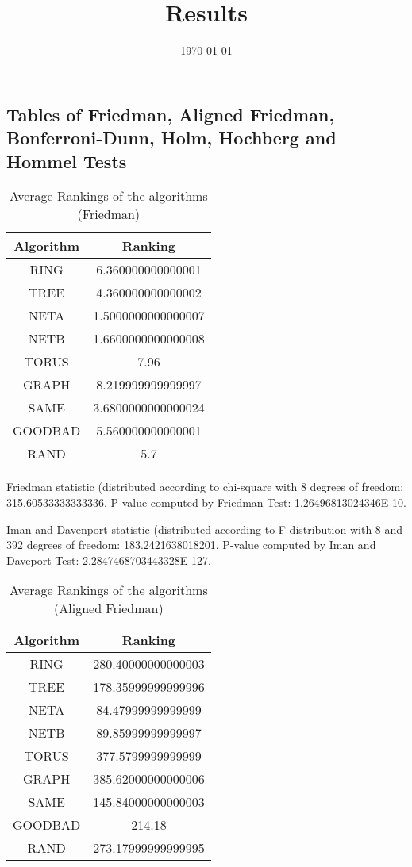 \documentclass[a4paper,10pt]{article}
\title{Results}
\author{}
\date{\today}
\begin{document}
\begin{landscape}
\oddsidemargin 0in \topmargin 0in\maketitle
\section{Tables of Friedman, Aligned Friedman, Bonferroni-Dunn, Holm, Hochberg and Hommel Tests}
\begin{table}[!htp]
\centering
\caption{Average Rankings of the algorithms (Friedman)
}\begin{tabular}{c|c}
Algorithm&Ranking\\
\hline
 RING&6.360000000000001\\
 TREE&4.360000000000002\\
 NETA&1.5000000000000007\\
 NETB&1.6600000000000008\\
 TORUS&7.96\\
 GRAPH&8.219999999999997\\
 SAME&3.6800000000000024\\
 GOODBAD&5.560000000000001\\
 RAND&5.7\\
\end{tabular}
\end{table}


Friedman statistic (distributed according to chi-square with 8 degrees of freedom: 315.60533333333336. 
P-value computed by Friedman Test: 1.26496813024346E-10.\newline

Iman and Davenport statistic (distributed according to F-distribution with 8 and 392 degrees of freedom: 183.2421638018201. 
P-value computed by Iman and Daveport Test: 2.2847468703443328E-127.\newline


\newpage

\begin{table}[!htp]
\centering
\caption{Average Rankings of the algorithms (Aligned Friedman)
}\begin{tabular}{c|c}
Algorithm&Ranking\\
\hline
 RING&280.40000000000003\\
 TREE&178.35999999999996\\
 NETA&84.47999999999999\\
 NETB&89.85999999999997\\
 TORUS&377.5799999999999\\
 GRAPH&385.62000000000006\\
 SAME&145.84000000000003\\
 GOODBAD&214.18\\
 RAND&273.17999999999995\\
\end{tabular}
\end{table}



\end{landscape}
\end{document}
